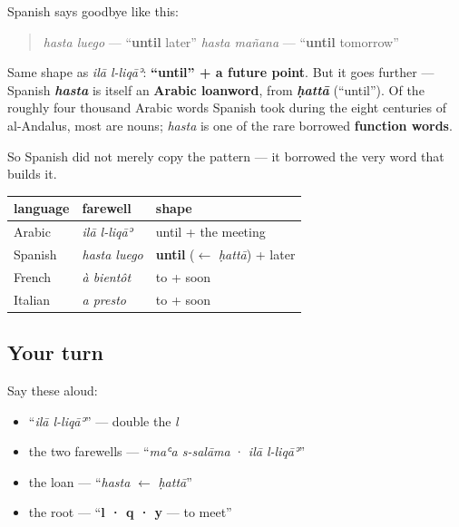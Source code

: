 \begin{culture}
Spanish says goodbye like this:

\begin{quote}
\emph{hasta luego} — \textquotedblleft{}\textbf{until} later\textquotedblright{} \emph{hasta mañana} — \textquotedblleft{}\textbf{until} tomorrow\textquotedblright{}
\end{quote}

Same shape as \emph{ilā l-liqāʾ}: \textbf{\textquotedblleft{}until\textquotedblright{} + a future point}. But it goes further — Spanish \emph{\textbf{hasta}} is itself an \textbf{Arabic loanword}, from \emph{\textbf{ḥattā}} (\textquotedblleft{}until\textquotedblright{}). Of the roughly four thousand Arabic words Spanish took during the eight centuries of al-Andalus, most are nouns; \emph{hasta} is one of the rare borrowed \textbf{function words}.

So Spanish did not merely copy the pattern — it borrowed the very word that builds it.

\noindent
\begin{tabularx}{\linewidth}{@{}>{\raggedright\arraybackslash}X>{\raggedright\arraybackslash}X>{\raggedright\arraybackslash}X@{}}
\toprule
\textbf{language} & \textbf{farewell} & \textbf{shape} \\
\midrule
Arabic & \emph{ilā l-liqāʾ} & until + the meeting \\
Spanish & \emph{hasta luego} & \textbf{until} ($\leftarrow$ \emph{ḥattā}) + later \\
French & \emph{à bientôt} & to + soon \\
Italian & \emph{a presto} & to + soon \\
\bottomrule
\end{tabularx}
\end{culture}

\subsection*{Your turn}
Say these aloud:

\begin{itemize}
\raggedright
  \item \textquotedblleft{}\emph{ilā l-liqāʾ}\textquotedblright{} — double the \emph{l}
  \item the two farewells — \textquotedblleft{}\emph{maʿa s-salāma} · \emph{ilā l-liqāʾ}\textquotedblright{}
  \item the loan — \textquotedblleft{}\emph{hasta} $\leftarrow$ \emph{ḥattā}\textquotedblright{}
  \item the root — \textquotedblleft{}\textbf{l · q · y} — to meet\textquotedblright{}
\end{itemize}

